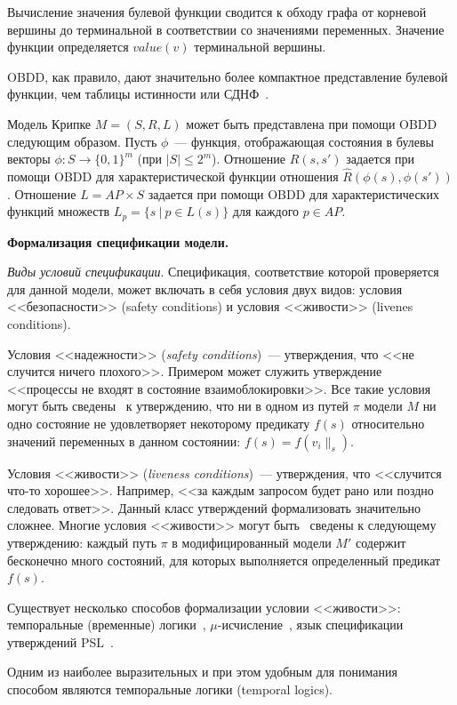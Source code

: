 \documentclass[a4paper,notitlepage,14pt]{article}
\begin{document}
Вычисление значения булевой функции сводится к обходу графа от корневой вершины до
терминальной в соответствии со значениями переменных. Значение функции определяется
$value(v)$ терминальной вершины. 

OBDD, как правило, дают значительно более компактное представление булевой функции, чем
таблицы истинности или СДНФ~\cite{Clarke}.

Модель Крипке $M = (S, R, L)$ может быть представлена при помощи OBDD следующим
образом. Пусть $\phi$~--- функция, отображающая состояния в булевы векторы $\phi: S
\rightarrow \{0, 1\}^m$ (при $|S| \leq 2^m$). Отношение $R(s, s')$ задается при помощи
OBDD для характеристической функции отношения $\widehat{R}(\phi(s), \phi(s'))$. Отношение
$L = AP \times S$ задается при помощи OBDD для характеристических функций множеств $L_p =
\{s~|~p \in L(s) \}$ для каждого $p \in AP$.

\textbf{Формализация спецификации модели.}

\textit{Виды условий спецификации}. Спецификация, соответствие которой проверяется для
данной модели, может включать в себя условия двух видов: условия <<безопасности>> (safety
conditions) и условия <<живости>> (livenes conditions).

Условия <<надежности>> (\emph{safety conditions})~--- утверждения, что <<не случится
ничего плохого>>. Примером может служить утверждение <<процессы не входят в состояние
взаимоблокировки>>. Все такие условия могут быть сведены~\cite{Clarke} к утверждению, что
ни в одном из путей $\pi$ модели $M$ ни одно состояние не удовлетворяет некоторому
предикату $f(s)$ относительно значений переменных в данном состоянии: $f(s) = f(v_i\|_s)$.

Условия <<живости>> (\emph{liveness conditions})~--- утверждения, что <<случится что-то
хорошее>>. Например, <<за каждым запросом будет рано или поздно следовать ответ>>. Данный
класс утверждений формализовать значительно сложнее. Многие условия <<живости>> могут
быть~\cite{Clarke97anotherlook} сведены к следующему утверждению: каждый путь $\pi$ в
модифицированный модели $M'$ содержит бесконечно много состояний, для которых выполняется
определенный предикат $f(s)$.

Существует несколько способов формализации условии <<живости>>: темпоральные (временные)
логики~\cite{Clarke,Pandya01modelchecking},
$\mu$-исчисление~\cite{Leucker_parallelmodel,Emerson97modelchecking}, язык спецификации
утверждений PSL~\cite{Glazberg_psl:beyond}.

Одним из наиболее выразительных и при этом удобным для понимания~\cite{Stirling96modaland}
способом являются темпоральные логики (temporal logics).
\end{document}
